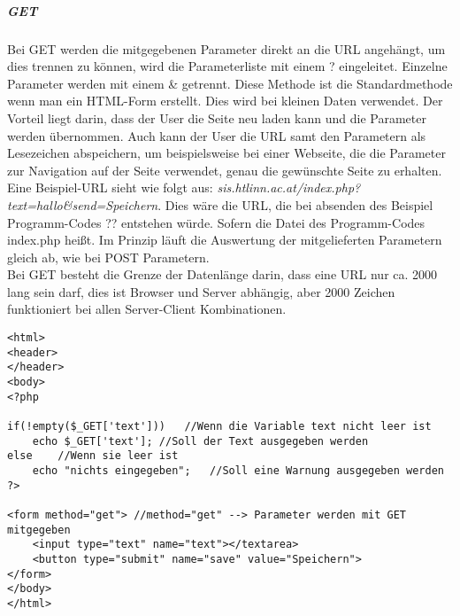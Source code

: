 \subparagraph{GET}
Bei GET werden die mitgegebenen Parameter direkt an die URL angehängt, um dies trennen zu können, wird die Parameterliste mit einem ? eingeleitet. Einzelne Parameter werden mit einem \& getrennt. Diese Methode ist die Standardmethode wenn man ein HTML-Form erstellt. Dies wird bei kleinen Daten verwendet. Der Vorteil liegt darin, dass der User die Seite neu laden kann und die Parameter werden übernommen. Auch kann der User die URL samt den Parametern als Lesezeichen abspeichern, um beispielsweise bei einer Webseite, die die Parameter zur Navigation auf der Seite verwendet, genau die gewünschte Seite zu erhalten. Eine Beispiel-URL sieht wie folgt aus: \textit{sis.htlinn.ac.at/index.php?text=hallo\&send=Speichern}. Dies wäre die URL, die bei absenden des Beispiel Programm-Codes ?? entstehen würde. Sofern die Datei des Programm-Codes index.php heißt. Im Prinzip läuft die Auswertung der mitgelieferten Parametern gleich ab, wie bei POST Parametern.\\
Bei GET besteht die Grenze der Datenlänge darin, dass eine URL nur ca. 2000 lang sein darf, dies ist Browser und Server abhängig, aber 2000 Zeichen funktioniert bei allen Server-Client Kombinationen.
\begin{lstlisting}[style=CustomPHP, caption={Beispiel GET}]
<html>
<header>
</header>
<body>
<?php

if(!empty($_GET['text']))	//Wenn die Variable text nicht leer ist
	echo $_GET['text'];	//Soll der Text ausgegeben werden
else	//Wenn sie leer ist
	echo "nichts eingegeben";	//Soll eine Warnung ausgegeben werden
?>

<form method="get">	//method="get" --> Parameter werden mit GET mitgegeben
	<input type="text" name="text"></textarea>
	<button type="submit" name="save" value="Speichern">
</form>
</body>
</html>
\end{lstlisting}
